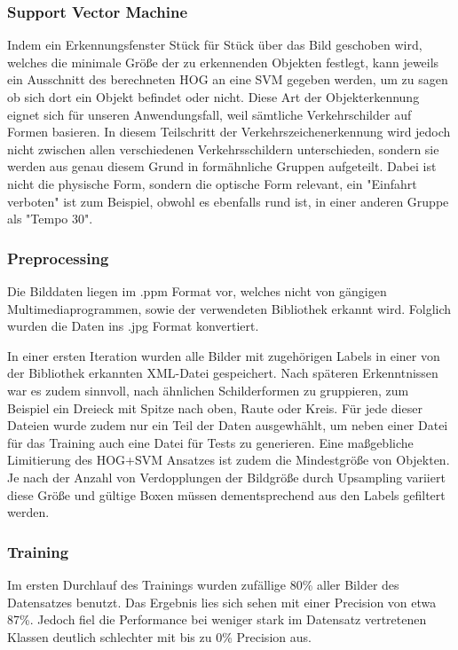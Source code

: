 \documentclass[runningheads]{llncs}
\begin{document}
\subsubsection{Support Vector Machine}
Indem ein Erkennungsfenster Stück für Stück über das Bild geschoben wird, welches die minimale Größe der zu erkennenden Objekten festlegt, kann jeweils ein Ausschnitt des berechneten HOG an eine SVM gegeben werden, um zu sagen ob sich dort ein Objekt befindet oder nicht. Diese Art der Objekterkennung eignet sich für unseren Anwendungsfall, weil sämtliche Verkehrschilder auf Formen basieren. In diesem Teilschritt der Verkehrszeichenerkennung wird jedoch nicht zwischen allen verschiedenen Verkehrsschildern unterschieden, sondern sie werden aus genau diesem Grund in formähnliche Gruppen aufgeteilt. Dabei ist nicht die physische Form, sondern die optische Form relevant, ein "Einfahrt verboten" ist zum Beispiel, obwohl es ebenfalls rund ist, in einer anderen Gruppe als "Tempo 30".

\subsubsection{Preprocessing}
Die Bilddaten liegen im .ppm Format vor, welches nicht von gängigen Multimediaprogrammen, sowie der verwendeten Bibliothek erkannt wird. Folglich wurden die Daten ins .jpg Format konvertiert.

In einer ersten Iteration wurden alle Bilder mit zugehörigen Labels in einer von der Bibliothek erkannten XML-Datei gespeichert. Nach späteren Erkenntnissen war es zudem sinnvoll, nach ähnlichen Schilderformen zu gruppieren, zum Beispiel ein Dreieck mit Spitze nach oben, Raute oder Kreis. Für jede dieser Dateien wurde zudem nur ein Teil der Daten ausgewhählt, um neben einer Datei für das Training auch eine Datei für Tests zu generieren.
Eine maßgebliche Limitierung des HOG+SVM Ansatzes ist zudem die Mindestgröße von Objekten. Je nach der Anzahl von Verdopplungen der Bildgröße durch Upsampling variiert diese Größe und gültige Boxen müssen dementsprechend aus den Labels gefiltert werden.

\subsubsection{Training}
Im ersten Durchlauf des Trainings wurden zufällige 80\% aller Bilder des Datensatzes benutzt. Das Ergebnis lies sich sehen mit einer Precision von etwa 87\%. Jedoch fiel die Performance bei weniger stark im Datensatz vertretenen Klassen deutlich schlechter mit bis zu 0\% Precision aus.
\end{document}
